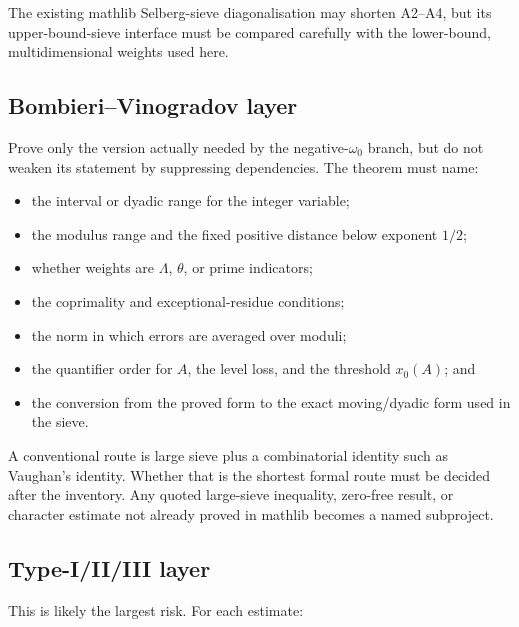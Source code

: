 \documentclass[11pt]{article}
\begin{document}
The existing mathlib Selberg-sieve diagonalisation may shorten A2--A4, but its
upper-bound-sieve interface must be compared carefully with the lower-bound,
multidimensional weights used here.

\subsection{Bombieri--Vinogradov layer}

Prove only the version actually needed by the negative-\(\omega_0\) branch,
but do not weaken its statement by suppressing dependencies.  The theorem must
name:

\begin{itemize}
\item the interval or dyadic range for the integer variable;
\item the modulus range and the fixed positive distance below exponent
  \(1/2\);
\item whether weights are \(\Lambda\), \(\theta\), or prime indicators;
\item the coprimality and exceptional-residue conditions;
\item the norm in which errors are averaged over moduli;
\item the quantifier order for \(A\), the level loss, and the threshold
  \(x_0(A)\); and
\item the conversion from the proved form to the exact moving/dyadic form used
  in the sieve.
\end{itemize}

A conventional route is large sieve plus a combinatorial identity such as
Vaughan's identity.  Whether that is the shortest formal route must be decided
after the inventory.  Any quoted large-sieve inequality, zero-free result, or
character estimate not already proved in mathlib becomes a named subproject.

\subsection{Type-I/II/III layer}

This is likely the largest risk.  For each estimate:
\end{document}
